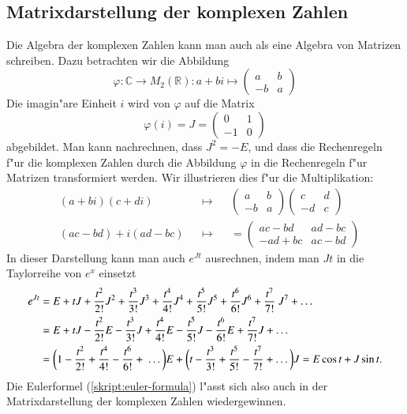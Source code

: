 \subsection{Matrixdarstellung der komplexen Zahlen\label{subsection:matrixdarstellung}}
Die Algebra der komplexen Zahlen kann man auch als eine Algebra von Matrizen
schreiben. Dazu betrachten wir die Abbildung
\[
\varphi\colon
\mathbb C\to M_2(\mathbb R):
a+bi\mapsto\begin{pmatrix}a&b\\-b&a\end{pmatrix}
\]
Die imagin"are Einheit $i$ wird von $\varphi$ auf die Matrix
\[
\varphi(i)=J=\begin{pmatrix}0&1\\-1&0\end{pmatrix}
\]
abgebildet. Man kann nachrechnen, dass $J^2=-E$, und dass die Rechenregeln
f"ur die komplexen Zahlen durch die Abbildung $\varphi$ in die Rechenregeln
f"ur Matrizen transformiert werden.
Wir illustrieren dies f"ur die Multiplikation:
\begin{align*}
&(a+bi)(c+di)&&\mapsto&
&\begin{pmatrix}a&b\\-b&a\end{pmatrix}
\begin{pmatrix}c&d\\-d&c\end{pmatrix}
\\
&(ac-bd) + i(ad-bc)&&\mapsto&
&=\begin{pmatrix}
ac-bd&ad-bc\\
-ad+bc&ac-bd
\end{pmatrix}
\end{align*}
In dieser Darstellung kann man auch $e^{Jt}$ ausrechnen, indem man $Jt$ in
die Taylorreihe von $e^x$ einsetzt
\begin{align}
e^{Jt}
&=
E + tJ + \frac{t^2}{2!} J^2 + \frac{t^3}{3!} J^3 + \frac{t^4}{4!} J^4
 + \frac{t^5}{5!} J^5 + \frac{t^6}{6!} J^6 + \frac{t^7}{7!} J^7 + \dots
\notag
\\
&=
E + tJ - \frac{t^2}{2!} E - \frac{t^3}{3!} J + \frac{t^4}{4!} E
 - \frac{t^5}{5!} J - \frac{t^6}{6!} E + \frac{t^7}{7!} J + \dots
\notag
\\
&=\biggl(1 - \frac{t^2}{2!} + \frac{t^4}{4!} - \frac{t^6}{6!} + \dots\biggr) E
+ \biggl(t - \frac{t^3}{3!} + \frac{t^5}{5!} - \frac{t^7}{7!} + \dots\biggr) J
= E \cos t + J \sin t.
\label{skript:eulermatrixdarstellung}
\end{align}
Die Eulerformel (\ref{skript:euler-formula}) l"asst sich also auch in der
Matrixdarstellung der komplexen Zahlen wiedergewinnen.

